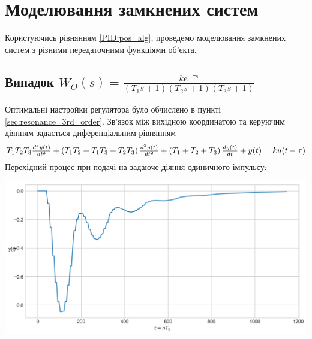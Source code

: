 \chapter{Моделювання замкнених систем}
Користуючись рівнянням \eqref{PID:pos_alg}, проведемо моделювання замкнених систем з різними
передаточними функціями об'єкта.

\section{Випадок 
\texorpdfstring{$W_O(s) = \frac{ k e^{-\tau s}}{(T_1 s + 1) (T_2 s + 1) (T_3 s + 1)}$}{1}}
Оптимальні настройки регулятора було обчислено в пункті \ref{sec:resonance_3rd_order}.
Зв'язок між вихідною координатою та керуючим діянням задається диференціальним рівнянням
\begin{gather*}
    \mbox{\normalsize 
    $T_1 T_2 T_3 \frac{d^3 y(t)}{dt^3} +
    \left(T_1 T_2 + T_1 T_3 + T_2 T_3 \right) \frac{d^2 y(t)}{dt^2} + 
    \left(T_1 + T_2 + T_3 \right) \frac{d y(t)}{dt} + y(t) = k u(t-\tau)$}
\end{gather*}
Перехідний процес при подачі на задаюче діяння одиничного імпульсу:
\begin{center}
    \includegraphics[width=\textwidth]{pics/transient_process_final_9_1_impulse.png}
\end{center}

